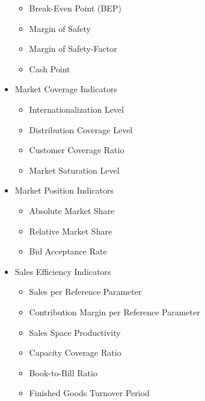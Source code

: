 \documentclass[]{book}
\providecommand{\tightlist}{%
  \setlength{\itemsep}{0pt}\setlength{\parskip}{0pt}}
\begin{document}
\begin{itemize}
  \begin{itemize}
  \tightlist
  \item
    Break-Even Point (BEP)\\
  \item
    Margin of Safety\\
  \item
    Margin of Safety-Factor\\
  \item
    Cash Point
  \end{itemize}
\item
  Market Coverage Indicators

  \begin{itemize}
  \tightlist
  \item
    Internationalization Level\\
  \item
    Distribution Coverage Level
  \item
    Customer Coverage Ratio\\
  \item
    Market Saturation Level
  \end{itemize}
\item
  Market Position Indicators

  \begin{itemize}
  \tightlist
  \item
    Absolute Market Share\\
  \item
    Relative Market Share
  \item
    Bid Acceptance Rate
  \end{itemize}
\item
  Sales Efficiency Indicators

  \begin{itemize}
  \tightlist
  \item
    Sales per Reference Parameter\\
  \item
    Contribution Margin per Reference Parameter\\
  \item
    Sales Space Productivity\\
  \item
    Capacity Coverage Ratio\\
  \item
    Book-to-Bill Ratio\\
  \item
    Finished Goods Turnover Period
  \end{itemize}
\end{itemize}
\end{document}
